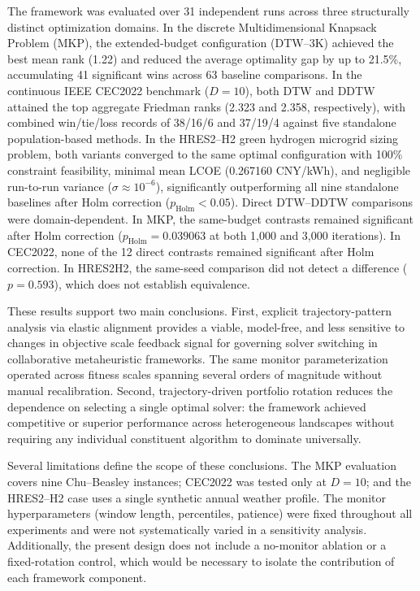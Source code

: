 \documentclass[review]{elsarticle}
\begin{document}
The framework was evaluated over 31 independent runs across three structurally distinct optimization domains. In the discrete Multidimensional Knapsack Problem (MKP), the extended-budget configuration (DTW--3K) achieved the best mean rank (1.22) and reduced the average optimality gap by up to 21.5\%, accumulating 41 significant wins across 63 baseline comparisons. In the continuous IEEE CEC2022 benchmark ($D=10$), both DTW and DDTW attained the top aggregate Friedman ranks (2.323 and 2.358, respectively), with combined win/tie/loss records of 38/16/6 and 37/19/4 against five standalone population-based methods. In the HRES2--H2 green hydrogen microgrid sizing problem, both variants converged to the same optimal configuration with 100\% constraint feasibility, minimal mean LCOE (0.267160 CNY/kWh), and negligible run-to-run variance ($\sigma \approx 10^{-6}$), significantly outperforming all nine standalone baselines after Holm correction ($p_{\mathrm{Holm}} < 0.05$). Direct DTW--DDTW comparisons were domain-dependent. In MKP, the same-budget contrasts remained significant after Holm correction ($p_{\mathrm{Holm}}=0.039063$ at both 1,000 and 3,000 iterations). In CEC2022, none of the 12 direct contrasts remained significant after Holm correction. In HRES2H2, the same-seed comparison did not detect a difference ($p=0.593$), which does not establish equivalence.

These results support two main conclusions. First, explicit trajectory-pattern analysis via elastic alignment provides a viable, model-free, and less sensitive to changes in objective scale feedback signal for governing solver switching in collaborative metaheuristic frameworks. The same monitor parameterization operated across fitness scales spanning several orders of magnitude without manual recalibration. Second, trajectory-driven portfolio rotation reduces the dependence on selecting a single optimal solver: the framework achieved competitive or superior performance across heterogeneous landscapes without requiring any individual constituent algorithm to dominate universally.

Several limitations define the scope of these conclusions. The MKP evaluation covers nine Chu--Beasley instances; CEC2022 was tested only at $D=10$; and the HRES2--H2 case uses a single synthetic annual weather profile. The monitor hyperparameters (window length, percentiles, patience) were fixed throughout all experiments and were not systematically varied in a sensitivity analysis. Additionally, the present design does not include a no-monitor ablation or a fixed-rotation control, which would be necessary to isolate the contribution of each framework component.
\end{document}
